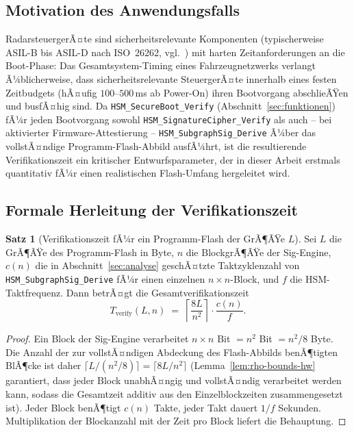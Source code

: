 ﻿\documentclass[a4paper,12pt]{article}
\theoremstyle{definition}
\newtheorem{satz}{Satz}
\begin{document}
\subsection{Motivation des Anwendungsfalls}

RadarsteuergerÃ¤te sind sicherheitsrelevante Komponenten (typischerweise ASIL-B bis ASIL-D nach ISO~26262, vgl.\ \cite{ISO26262}) mit harten Zeitanforderungen an die Boot-Phase: Das Gesamtsystem-Timing eines Fahrzeugnetzwerks verlangt Ã¼blicherweise, dass sicherheitsrelevante SteuergerÃ¤te innerhalb eines festen Zeitbudgets (hÃ¤ufig $100$--$500$\,ms ab Power-On) ihren Bootvorgang abschlieÃŸen und busfÃ¤hig sind. Da \texttt{HSM\_SecureBoot\_Verify} (Abschnitt~\ref{sec:funktionen}) fÃ¼r jeden Bootvorgang sowohl \texttt{HSM\_SignatureCipher\_Verify} als auch -- bei aktivierter Firmware-Attestierung -- \texttt{HSM\_SubgraphSig\_Derive} Ã¼ber das vollstÃ¤ndige Programm-Flash-Abbild ausfÃ¼hrt, ist die resultierende Verifikationszeit ein kritischer Entwurfsparameter, der in dieser Arbeit erstmals quantitativ fÃ¼r einen realistischen Flash-Umfang hergeleitet wird.

\subsection{Formale Herleitung der Verifikationszeit}

\begin{satz}[Verifikationszeit fÃ¼r ein Programm-Flash der GrÃ¶ÃŸe $L$]
	\label{satz:bootzeit}
	Sei $L$ die GrÃ¶ÃŸe des Programm-Flash in Byte, $n$ die BlockgrÃ¶ÃŸe der Sig-Engine, $c(n)$ die in Abschnitt~\ref{sec:analyse} geschÃ¤tzte Taktzyklenzahl von \texttt{HSM\_SubgraphSig\_Derive} fÃ¼r einen einzelnen $n \times n$-Block, und $f$ die HSM-Taktfrequenz. Dann betrÃ¤gt die Gesamtverifikationszeit
	\[
	T_{\mathrm{verify}}(L,n) \;=\; \left\lceil \frac{8L}{n^2} \right\rceil \cdot \frac{c(n)}{f}.
	\]
\end{satz}

\begin{proof}
	Ein Block der Sig-Engine verarbeitet $n \times n$ Bit $= n^2$ Bit $= n^2/8$ Byte. Die Anzahl der zur vollstÃ¤ndigen Abdeckung des Flash-Abbilds benÃ¶tigten BlÃ¶cke ist daher $\lceil L / (n^2/8) \rceil = \lceil 8L/n^2 \rceil$ (Lemma~\ref{lem:rho-bounds-hw} garantiert, dass jeder Block unabhÃ¤ngig und vollstÃ¤ndig verarbeitet werden kann, sodass die Gesamtzeit additiv aus den Einzelblockzeiten zusammengesetzt ist). Jeder Block benÃ¶tigt $c(n)$ Takte, jeder Takt dauert $1/f$ Sekunden. Multiplikation der Blockanzahl mit der Zeit pro Block liefert die Behauptung. \qedhere
\end{proof}
\end{document}
